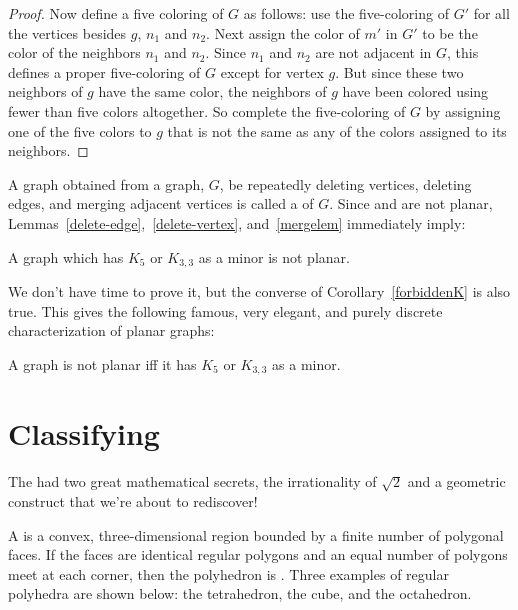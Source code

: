 \begin{proof}
Now define a five coloring of $G$ as follows: use the five-coloring of $G'$
for all the vertices besides $g$, $n_1$ and $n_2$.  Next assign the color
of $m'$ in $G'$ to be the color of the neighbors $n_1$ and $n_2$.  Since
$n_1$ and $n_2$ are not adjacent in $G$, this defines a proper
five-coloring of $G$ except for vertex $g$.  But since these two neighbors
of $g$ have the same color, the neighbors of $g$ have been colored using
fewer than five colors altogether.  So complete the five-coloring of $G$ by
assigning one of the five colors to $g$ that is not the same as any of the
colors assigned to its neighbors.

\end{proof}

A graph obtained from a graph, $G$, be repeatedly deleting vertices,
deleting edges, and merging adjacent vertices is called a  of
$G$.  Since  and  are not planar,
Lemmas~\ref{delete-edge},~\ref{delete-vertex}, and~\ref{mergelem}
immediately imply:

\begin{corollary}\label{forbiddenK}
  A graph which has $K_5$ or $K_{3,3}$ as a minor is not planar.
\end{corollary}

We don't have time to prove it, but the converse of
Corollary~\ref{forbiddenK} is also true.  This gives the following famous,
very elegant, and purely discrete characterization of planar graphs:

\begin{theorem}
  A graph is not planar iff it has $K_5$ or $K_{3,3}$ as a minor.
\end{theorem}

\section{Classifying }

The  had two great mathematical secrets, the
irrationality of $\sqrt{2}$ and a geometric construct that we're about to
rediscover!

A  is a convex, three-dimensional region bounded by a
finite number of polygonal faces.  If the faces are identical regular
polygons and an equal number of polygons meet at each corner, then the
polyhedron is .  Three examples
of regular polyhedra are shown below: the tetrahedron, the cube, and the
octahedron.

